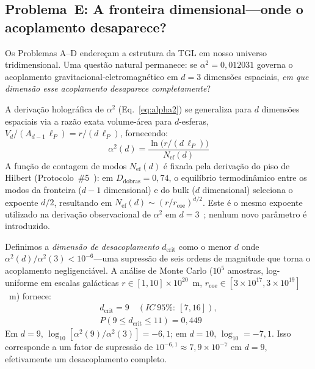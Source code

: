 \documentclass[12pt,a4paper,twocolumn]{article}
\newcommand{\alphaii}{\alpha^{2}}
\newcommand{\Dfolds}{D_{\text{dobras}}}
\begin{document}
\subsection{Problema~E: A fronteira dimensional---onde o acoplamento desaparece?}
\label{sec:dimensional}

Os Problemas A--D endereçam a estrutura da TGL em nosso universo tridimensional. Uma questão natural permanece: se $\alphaii = 0{,}012031$ governa o acoplamento gravitacional-eletromagnético em $d = 3$ dimensões espaciais, \emph{em que dimensão esse acoplamento desaparece completamente}?

A derivação holográfica de $\alphaii$ (Eq.~\ref{eq:alpha2}) se generaliza para $d$ dimensões espaciais via a razão exata volume-área para $d$-esferas, $V_d / (A_{d-1}\,\ell_P) = r / (d\,\ell_P)$, fornecendo:
\begin{equation}
\alpha^2(d) = \frac{\ln\!\bigl(r / (d\,\ell_P)\bigr)}{N_{\text{ef}}(d)}
\label{eq:alpha2_d}
\end{equation}
A função de contagem de modos $N_{\text{ef}}(d)$ é fixada pela derivação do piso de Hilbert (Protocolo~\#5~\cite{Miguel2026Fronteira}): em $\Dfolds = 0{,}74$, o equilíbrio termodinâmico entre os modos da fronteira ($d{-}1$ dimensional) e do bulk ($d$ dimensional) seleciona o expoente $d/2$, resultando em $N_{\text{ef}}(d) \sim (r / r_{\text{coe}})^{d/2}$. Este é o mesmo expoente utilizado na derivação observacional de $\alphaii$ em $d = 3$~\cite{Miguel2026Acoplamento}; nenhum novo parâmetro é introduzido.

Definimos a \emph{dimensão de desacoplamento} $d_{\text{crit}}$ como o menor $d$ onde $\alpha^2(d) / \alpha^2(3) < 10^{-6}$---uma supressão de seis ordens de magnitude que torna o acoplamento negligenciável. A análise de Monte Carlo ($10^5$ amostras, log-uniforme em escalas galácticas $r \in [1, 10] \times 10^{20}$~m, $r_{\text{coe}} \in [3 \times 10^{17}, 3 \times 10^{19}]$~m) fornece:
\begin{multline}
d_{\text{crit}} = 9 \quad (IC\ 95\%:\ [7, 16]), \\
P(9 \leq d_{\text{crit}} \leq 11) = 0{,}449
\label{eq:dcrit}
\end{multline}
Em $d = 9$, $\log_{10}[\alpha^2(9)/\alpha^2(3)] = -6{,}1$; em $d = 10$, $\log_{10} = -7{,}1$. Isso corresponde a um fator de supressão de $10^{-6{,}1} \approx 7{,}9 \times 10^{-7}$ em $d = 9$, efetivamente um desacoplamento completo.
\end{document}
